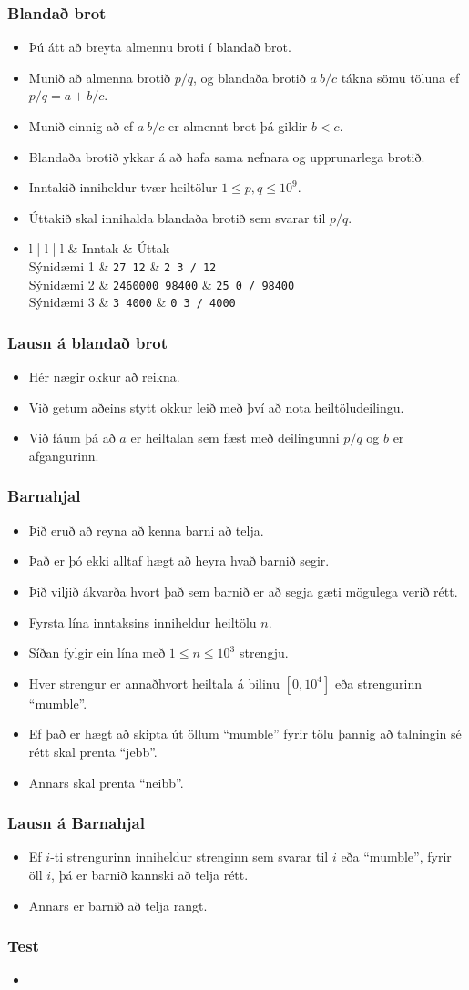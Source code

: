 \documentclass{beamer}
\newcommand\env[2]
{
	\begin{#1}
	#2
	\end{#1}
}
\newcommand\code[1]{\tiny}
\begin{document}
\env{frame}
{
	\frametitle{Blandað brot}
	\env{itemize}
	{
		\item<1-> Þú átt að breyta almennu broti í blandað brot.
		\item<2-> Munið að almenna brotið $p/q$, og blandaða brotið $a\ b/c$ tákna sömu töluna ef $p/q = a + b/c$.
		\item<3-> Munið einnig að ef $a\ b/c$ er almennt brot þá gildir $b < c$.
		\item<4-> Blandaða brotið ykkar á að hafa sama nefnara og upprunarlega brotið.
		\item<5-> Inntakið inniheldur tvær heiltölur $1 \leq p, q \leq 10^9$.
		\item<6-> Úttakið skal innihalda blandaða brotið sem svarar til $p/q$.
		\item<7->
		\env{tabular}
		{
			{l | l | l}
			& Inntak & Úttak\\
			\hline
			Sýnidæmi 1 & \texttt{27 12} & \texttt{2 3 / 12}\\
			Sýnidæmi 2 & \texttt{2460000 98400} & \texttt{25 0 / 98400}\\
			Sýnidæmi 3 & \texttt{3 4000} & \texttt{0 3 / 4000}\\
		}
	}
}

\env{frame}
{
	\frametitle{Lausn á blandað brot}
	\env{itemize}
	{
		\item<1-> Hér nægir okkur að reikna.
		\item<2-> Við getum aðeins stytt okkur leið með því að nota heiltöludeilingu.
		\item<3-> Við fáum þá að $a$ er heiltalan sem fæst með deilingunni $p/q$ og $b$ er afgangurinn.
	}
}

\env{frame}
{
	\code{mixedfractions.c}
}

\env{frame}
{
	\frametitle{Barnahjal}
	\env{itemize}
	{
		\item<1-> Þið eruð að reyna að kenna barni að telja.
		\item<2-> Það er þó ekki alltaf hægt að heyra hvað barnið segir.
		\item<3-> Þið viljið ákvarða hvort það sem barnið er að segja gæti mögulega verið rétt.
		\item<4-> Fyrsta lína inntaksins inniheldur heiltölu $n$.
		\item<5-> Síðan fylgir ein lína með $1 \leq n \leq 10^3$ strengju.
		\item<6-> Hver strengur er annaðhvort heiltala á bilinu $[0, 10^4]$ eða strengurinn ``mumble''.
		\item<7-> Ef það er hægt að skipta út öllum ``mumble'' fyrir tölu þannig að talningin sé rétt skal prenta ``jebb''.
		\item<8-> Annars skal prenta ``neibb''.
	}
}

\env{frame}
{
	\frametitle{Lausn á Barnahjal}
	\env{itemize}
	{
		\item<1-> Ef $i$-ti strengurinn inniheldur strenginn sem svarar til $i$ eða ``mumble'', fyrir öll $i$, þá er barnið kannski að telja rétt.
		\item<2-> Annars er barnið að telja rangt.
	}
}

\env{frame}
{
	\code{babybites.py}
}

\env{frame}
{
	\frametitle{Test}
	\env{itemize}
	{
		\item<1->
	}
}
\end{document}
